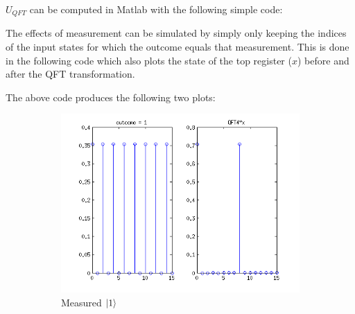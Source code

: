 \documentclass[12pt]{article}
\newenvironment{answer}{\begingroup\setlength{\leftskip}{-\leftmargin}\begin{framed}}{\end{framed}\endgroup}
\begin{document}
\begin{enumerate}
\begin{answer}
        $U_{QFT}$ can be computed in Matlab with the following simple code:
    \end{answer}
    
    \begin{answer}
        The effects of measurement can be simulated by simply only keeping the indices of the input states for which the outcome equals that measurement. This is done in the following code which also plots the state of the top register ($x$) before and after the QFT transformation.
    \end{answer}
    
    \begin{answer}
        The above code produces the following two plots:
    \end{answer}
    \begin{figure}[h]
        \centering
        \begin{subfigure}[b]{0.45\textwidth}
                \includegraphics[width=\textwidth]{html/code_01.png}
                \caption{Measured $\ket{1}$}
        \end{subfigure}%
        ~ %
        \begin{subfigure}[b]{0.45\textwidth}

\end{subfigure}
\end{figure}
\end{enumerate}
\end{document}

